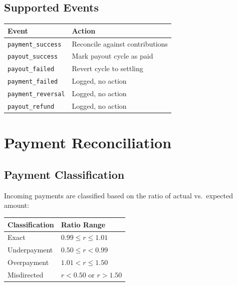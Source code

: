 \documentclass[11pt,a4paper]{article}
\begin{document}
\subsection{Supported Events}

\begin{table}[h]
  \centering
  \begin{tabular}{ll}
    \toprule
    Event & Action \\
    \midrule
    \texttt{payment\_success}   & Reconcile against contributions \\
    \texttt{payout\_success}    & Mark payout cycle as paid \\
    \texttt{payout\_failed}     & Revert cycle to settling \\
    \texttt{payment\_failed}    & Logged, no action \\
    \texttt{payment\_reversal}  & Logged, no action \\
    \texttt{payout\_refund}     & Logged, no action \\
    \bottomrule
  \end{tabular}
\end{table}

\section{Payment Reconciliation}

\subsection{Payment Classification}

Incoming payments are classified based on the ratio of actual vs.\ expected
amount:

\begin{table}[h]
  \centering
  \begin{tabular}{ll}
    \toprule
    Classification & Ratio Range \\
    \midrule
    Exact        & $0.99 \leq r \leq 1.01$ \\
    Underpayment & $0.50 \leq r < 0.99$ \\
    Overpayment  & $1.01 < r \leq 1.50$ \\
    Misdirected  & $r < 0.50$ or $r > 1.50$ \\
    \bottomrule
  \end{tabular}
\end{table}
\end{document}
